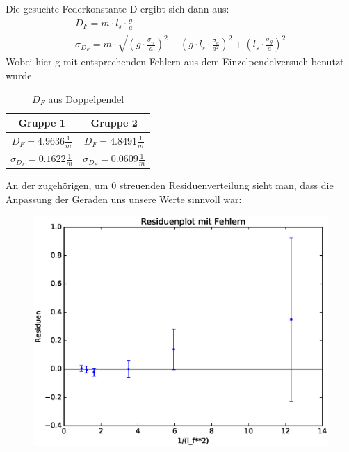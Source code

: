 \documentclass[12pt,a4paper]{article}
\begin{document}
Die gesuchte Federkonstante D ergibt sich dann aus:
\begin{align}
D_F=m \cdot l_s \cdot \frac{g}{a}\\
\sigma_{D_F}=m \cdot \sqrt{(g\cdot \frac{\sigma_{l_s}}{a})^2+(g\cdot l_s \cdot \frac{\sigma_a}{a^2})^2+(l_s \cdot \frac{\sigma_g}{a})^2}
\end{align}
Wobei hier g mit entsprechenden Fehlern aus dem Einzelpendelversuch benutzt wurde.
\begin{table}[H]\centering
\caption{$D_F$ aus Doppelpendel}
\begin{tabular}{c|c}
Gruppe 1 & Gruppe 2\\ 
\hline
$D_F=4.9636\frac{1}{m}$& $D_F=4.8491 \frac{1}{m}$\\ 
$\sigma_{D_F}=0.1622 \frac{1}{m}$& $\sigma_{D_F}=0.0609 \frac{1}{m}$\\
\end{tabular} 
\end{table}
An der zugehörigen, um 0 streuenden Residuenverteilung sieht man, dass die Anpassung der Geraden uns unsere Werte sinnvoll war:
\begin{figure}[H]
\caption{}
\centering
\includegraphics[scale=0.8]{Bilder/Bestimmung_D_Residuen.eps}
\end{figure}
\end{document}
